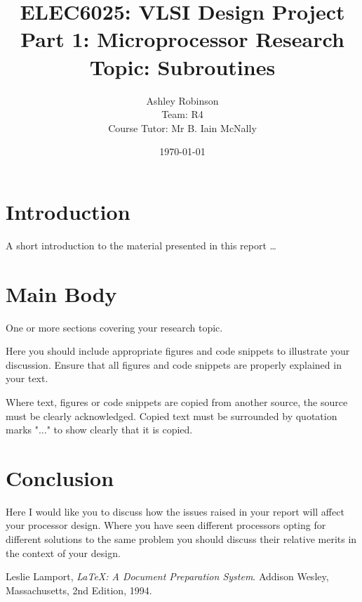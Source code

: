 \documentclass[12pt,a4paper]{article}
\title{ELEC6025: VLSI Design Project \\Part 1: Microprocessor Research\\Topic: Subroutines}
\author{Ashley Robinson\\ Team: R4\\Course Tutor: Mr B. Iain McNally}
\date{\today}
\begin{document}
\begin{titlepage}
\maketitle
\end{titlepage}

\tableofcontents
\clearpage

\section{Introduction}
A short introduction to the material presented in this report \dots\citep{greenwade93}

\section{Main Body}
One or more sections covering your research topic.

Here you should include appropriate figures and code snippets to illustrate your discussion. Ensure that all figures and code snippets are properly explained in your text.

Where text, figures or code snippets are copied from another source, the source must be clearly acknowledged. Copied text must be surrounded by quotation marks "..." to show clearly that it is copied. 

\section{Conclusion}
Here I would like you to discuss how the issues raised in your report will affect your processor design. Where you have seen different processors opting for different solutions to the same problem you should discuss their relative merits in the context of your design. 



\renewcommand{\refname}{Bibliography}
\begin{thebibliography}{9}

  Leslie Lamport,
  \emph{\LaTeX: A Document Preparation System}.
  Addison Wesley, Massachusetts,
  2nd Edition,
  1994.

\end{thebibliography}
\end{document}
